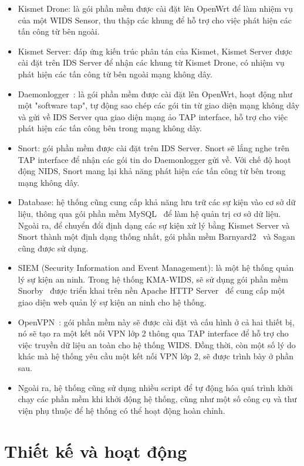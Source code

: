 \begin{itemize}
\item Kismet Drone: là gói phần mềm được cài đặt lên OpenWrt để làm nhiệm vụ của một WIDS Sensor, thu thập các khung để hỗ trợ cho việc phát hiện các tấn công từ bên ngoài.
\item Kismet Server: đáp ứng kiến trúc phân tán của Kismet, Kismet Server được cài đặt trên IDS Server để nhận các khung từ Kismet Drone, có nhiệm vụ phát hiện các tấn công từ bên ngoài mạng không dây.
\item Daemonlogger~\cite{martin2008daemonlogger}: là gói phần mềm được cài đặt lên OpenWrt, hoạt động như một "software tap", tự động sao chép các gói tin từ giao diện mạng không dây và gửi về IDS Server qua giao diện mạng ảo TAP interface, hỗ trợ cho việc phát hiện các tấn công bên trong mạng không dây.
\item Snort: gói phần mềm được cài đặt trên IDS Server. Snort sẽ lắng nghe trên TAP interface để nhận các gói tin do Daemonlogger gửi về. Với chế độ hoạt động NIDS, Snort mang lại khả năng phát hiện các tấn công từ bên trong mạng không dây.
\item Database: hệ thống cũng cung cấp khả năng lưu trữ các sự kiện vào cơ sở dữ liệu, thông qua gói phần mềm MySQL~\cite{rasberry2017raspberry} để làm hệ quản trị cơ sở dữ liệu. Ngoài ra, để chuyển đổi định dạng các sự kiện xử lý bằng Kismet Server và Snort thành một định dạng thống nhất, gói phần mềm Barnyard2~\cite{ian2016barnyard2} và Sagan~\cite{quadrant2017sagan} cũng được sử dụng.
\item SIEM (Security Information and Event Management): là một hệ thống quản lý sự kiện an ninh. Trong hệ thống KMA-WIDS, sẽ sử dụng gói phần mềm Snorby~\cite{community2017snorby} được triển khai trên nền Apache HTTP Server~\cite{apache2017apache} để cung cấp một giao diện web quản lý sự kiện an ninh cho hệ thống.
\item OpenVPN~\cite{vpn2017documentation}: gói phần mềm này sẽ được cài đặt và cấu hình ở cả hai thiết bị, nó sẽ tạo ra một kết nối VPN lớp 2 thông qua TAP interface để hỗ trợ cho việc truyền dữ liệu an toàn cho hệ thống WIDS. Đồng thời, còn một số lý do khác mà hệ thống yêu cầu một kết nối VPN lớp 2, sẽ được trình bày ở phần sau.
\item Ngoài ra, hệ thống cũng sử dụng nhiều script để tự động hóa quá trình khởi chạy các phần mềm khi khởi động hệ thống, cũng như một số công cụ và thư viện phụ thuộc để hệ thống có thể hoạt động hoàn chỉnh. 
\end{itemize}

\section{Thiết kế và hoạt động}
